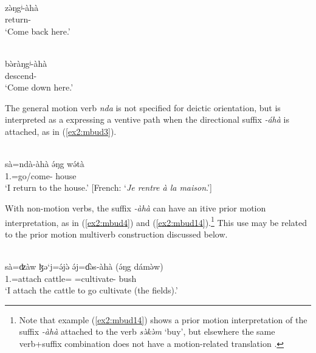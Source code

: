 \ea\label{ex2:mbud1}
 \\
\gll  zə̀ŋgʲ-àhà \\
return- \\
\glt `Come back here.'

\ex\label{ex2:mbud2}
 \\
\gll bə̀ràŋgʲ-àhà \\
descend- \\
\glt `Come down here.'
\z 

The general motion verb \textit{nda} is not specified for deictic orientation, but is interpreted as a expressing a ventive path when the directional suffix \textit{-áhà} is attached, as in (\ref{ex2:mbud3}).

\ea\label{ex2:mbud3}
 \\
\gll sà=ndà-àhà	ə́ŋg	wə́tà \\
1.=go/come-		house \\
\glt `I return to the house.' [French: `\textit{Je rentre à la maison}.']
\z 

With non-motion verbs, the suffix \textit{-àhà} can have an itive prior motion interpretation, as in (\ref{ex2:mbud4}) and (\ref{ex2:mbud14}).\footnote{Note that example (\ref{ex2:mbud14}) shows a prior motion interpretation of the suffix \textit{-àhà} attached to the verb \textit{sə̀kə̀m} `buy', but elsewhere the same verb+suffix combination does not have a motion-related translation \citep[143, 176, 181, 261, 343, 435]{fobakayyangPhonologieMorphologieSyntaxe2021}.} This use may be related to the prior motion multiverb construction discussed below. 

\ea\label{ex2:mbud4}
 \\
\gll sà=ʣàw	ɮə`j=ə́jə̀	ə́j=ɗə̀s-àhà	(ə́ŋg	dámə̀w) \\
1.=attach	cattle=	=cultivate-		bush \\
\glt `I attach the cattle to go cultivate (the fields).' 

